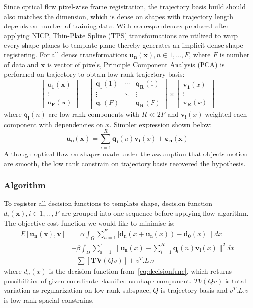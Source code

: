 Since optical flow pixel-wise frame registration, the trajectory basis build should also matches the dimension, which is dense on shapes with trajectory length depends on number of training data. With correspondences produced after applying NICP, Thin-Plate Spline (TPS)\cite{?} transformations are utilized to warp every shape planes to template plane thereby generates an implicit dense shape registering. For all dense transformations $\bm{u_n}(\bm{x}), n \in {1,...,F}$, where $F$ is number of data and $\bm{x}$ is vector of pixels, Principle Component Analysis (PCA) is performed on trajectory to obtain low rank trajectory basis:
\begin{equation}
    \begin{bmatrix}
        \bm{u_1}(\bm{x}) \\
        \vdots \\
        \bm{u_F}(\bm{x})
    \end{bmatrix}
    =
    \begin{bmatrix}
        \bm{q_1}(1) & \cdots & \bm{q_R}(1) \\
        \vdots      & \ddots & \vdots  \\
        \bm{q_1}(F) & \cdots & \bm{q_R}(F)
    \end{bmatrix}
    \times
    \begin{bmatrix}
        \bm{v_1}(x) \\
        \vdots \\
        \bm{v_R}(x)
    \end{bmatrix}
\end{equation}
where $\bm{q_i}(n)$ are low rank components with $R \ll 2F$ and $\bm{v_i}(x)$ weighted each component with dependencies on $x$. Simpler expression shown below:
\begin{equation}
    \bm{u_n}(\bm{x})=\sum_{i=1}^R\bm{q_i}(n)\bm{v_i}(x)+\bm{\varepsilon_n}(\bm{x})
\end{equation}
Although optical flow on shapes made under the assumption that objects motion are smooth, the low rank constrain on trajectory basis recovered the hypothesis.

\subsubsection{Algorithm}
To register all decision functions to template shape, decision function $d_i(\bm{x}), i \in {1,...,F}$ are grouped into one sequence before applying flow algorithm. The objective cost function we would like to minimise is:
\begin{align}
    E[\bm{u_n}(\bm{x}), \bm{v}]&=\alpha \int_{\Omega}\sum_{n=1}^F|\bm{d_n}(x+\bm{u_n}(x))-\bm{d_0}(x)\| dx  \label{eq:costfunc}\\
    &+ \beta \int_{\Omega}\sum_{n=1}^F\|\bm{u_n}(x)-\sum_{i=1}^R\bm{q_i}(n)\bm{v_i}(x)\|^2 dx \label{eq:lowrank}\\
    &+ \sum[\bm{TV}(Qv)]  + v^T.L.v
\end{align}
where $d_n(x)$ is the decision function from~\eqref{eq:decisionfunc}, which returns possibilities of given coordinate classified as shape compunent. $TV(Qv)$ is total variation as regularization on low rank subspace, $Q$ is trajectory basis and $v^T.L.v$ is low rank spacial constrains.

